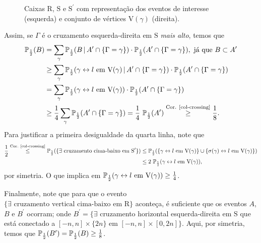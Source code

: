 \begin{figure*}[!htbp]
	\centering
	
	\vspace{-12pt}
	\caption{Caixas $\text{R}$, $\text{S}$ e $\text{S}^{\prime}$ com representação dos eventos de interesse (esquerda) e conjunto de vértices $\text{V}(\gamma)$ (direita).}
	\label{fig-cruz}
\end{figure*}

\par Assim, se $\Gamma$ é o cruzamento esquerda-direita em $\text{S}$ \textit{mais alto}, temos que
\begin{align*}
	\operatorname{\mathbb{P}}_{\frac{1}{2}}(B) &= \sum_{\gamma}\operatorname{\mathbb{P}}_{\frac{1}{2}}(B\,|\,A^{\prime} \cap \{\Gamma = \gamma\}) \cdot \operatorname{\mathbb{P}}_{\frac{1}{2}}(A^{\prime} \cap \{\Gamma = \gamma\}), \text{ já que } B \subset A^{\prime} \\
	&\geq  \sum_{\gamma}\operatorname{\mathbb{P}}_{\frac{1}{2}}(\gamma \leftrightarrow l \text{ em } \text{V}(\gamma) \,|\, A^{\prime} \cap \{\Gamma = \gamma\}) \cdot \operatorname{\mathbb{P}}_{\frac{1}{2}}(A^{\prime} \cap \{\Gamma = \gamma\}) \\
	&= \sum_{\gamma}\operatorname{\mathbb{P}}_{\frac{1}{2}}(\gamma \leftrightarrow l \text{ em } \text{V}(\gamma)) \cdot \operatorname{\mathbb{P}}_{\frac{1}{2}}(A^{\prime} \cap \{\Gamma = \gamma\}) \\
	&\geq \frac{1}{4}\sum_{\gamma}\operatorname{\mathbb{P}}_{\frac{1}{2}}(A^{\prime} \cap \{\Gamma = \gamma\}) = \frac{1}{4}\,\operatorname{\mathbb{P}}_{\frac{1}{2}}(A^{\prime}) \overset{\text{\scriptsize{Cor. \ref{col-crossing}}}}{\geq} \frac{1}{8}.
\end{align*}  
Para justificar a primeira desigualdade da quarta linha, note que
\begin{align*}
	\frac{1}{2} \overset{\text{\scriptsize{Cor. \ref{col-crossing}}}}{\leq} \operatorname{\mathbb{P}}_{\frac{1}{2}}(\{\exists \text{ cruzamento cima-baixo em } \text{S}^{\prime}\}) &\leq \operatorname{\mathbb{P}}_{\frac{1}{2}}(\{\gamma \leftrightarrow l \text{ em } \text{V}(\gamma)\} \cup \{\sigma(\gamma) \leftrightarrow l \text{ em } \text{V}(\gamma)\}) \\ 
	&\leq 2\,\operatorname{\mathbb{P}}_{\frac{1}{2}}(\gamma \leftrightarrow l \text{ em } \text{V}(\gamma)),
\end{align*}
por simetria. O que implica em $\operatorname{\mathbb{P}}_{\frac{1}{2}}(\gamma \leftrightarrow l \text{ em } \text{V}(\gamma)) \geq \frac{1}{4}$. 

\par Finalmente, note que para que o evento $\{\exists \text{ cruzamento vertical cima-baixo em } \text{R}\}$ aconteça, é suficiente que os eventos $A$, $B$ e $B^{\prime}$ ocorram; onde $B^{\prime} = \{\exists$ cruzamento horizontal esquerda-direita em $\text{S}$ que está conectado a $[-n, n] \times \{2n\}$ em $[-n, n] \times [0, 2n]\}$. Aqui, por simetria, temos que $\operatorname{\mathbb{P}}_{\frac{1}{2}}(B^{\prime}) = \operatorname{\mathbb{P}}_{\frac{1}{2}}(B) \geq \frac{1}{8}$.

